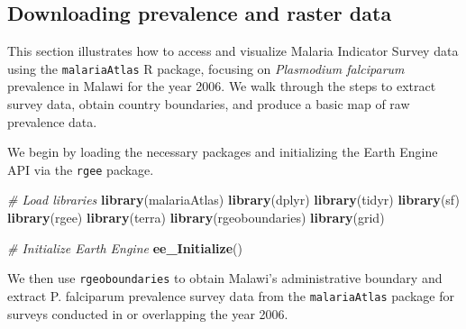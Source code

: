 \documentclass[
  letterpaper,
]{krantz}
\newenvironment{Shaded}{\begin{snugshade}}{\end{snugshade}}
\newcommand{\CommentTok}[1]{\textcolor[rgb]{0.56,0.35,0.01}{\textit{#1}}}
\newcommand{\FunctionTok}[1]{\textcolor[rgb]{0.13,0.29,0.53}{\textbf{#1}}}
\newcommand{\NormalTok}[1]{#1}
\begin{document}
\subsection{Downloading prevalence and raster
data}\label{downloading-prevalence-and-raster-data}

This section illustrates how to access and visualize Malaria Indicator
Survey data using the \texttt{malariaAtlas} R package, focusing on
\emph{Plasmodium falciparum} prevalence in Malawi for the year 2006. We
walk through the steps to extract survey data, obtain country
boundaries, and produce a basic map of raw prevalence data.

We begin by loading the necessary packages and initializing the Earth
Engine API via the \texttt{rgee} package.

\begin{Shaded}
\begin{Highlighting}[]
\CommentTok{\# Load libraries}
\FunctionTok{library}\NormalTok{(malariaAtlas)}
\FunctionTok{library}\NormalTok{(dplyr)}
\FunctionTok{library}\NormalTok{(tidyr)}
\FunctionTok{library}\NormalTok{(sf)}
\FunctionTok{library}\NormalTok{(rgee)}
\FunctionTok{library}\NormalTok{(terra)}
\FunctionTok{library}\NormalTok{(rgeoboundaries)}
\FunctionTok{library}\NormalTok{(grid)}

\CommentTok{\# Initialize Earth Engine}
\FunctionTok{ee\_Initialize}\NormalTok{()}
\end{Highlighting}
\end{Shaded}

We then use \texttt{rgeoboundaries} to obtain Malawi's administrative
boundary and extract P. falciparum prevalence survey data from the
\texttt{malariaAtlas} package for surveys conducted in or overlapping
the year 2006.
\end{document}
